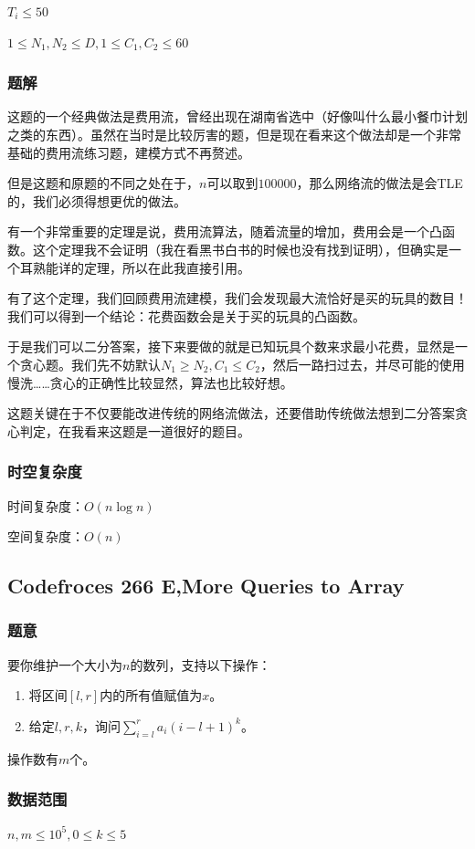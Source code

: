 \documentclass{ctexart}
\begin{document}
$T_i \le 50$

$1 \le N_1,N_2 \le D,1 \le C_1,C_2 \le 60$
\subsubsection{题解}
这题的一个经典做法是费用流，曾经出现在湖南省选中（好像叫什么最小餐巾计划之类的东西）。虽然在当时是比较厉害的题，但是现在看来这个做法却是一个非常基础的费用流练习题，建模方式不再赘述。

但是这题和原题的不同之处在于，$n$可以取到$100000$，那么网络流的做法是会TLE的，我们必须得想更优的做法。

有一个非常重要的定理是说，费用流算法，随着流量的增加，费用会是一个凸函数。这个定理我不会证明（我在看黑书白书的时候也没有找到证明），但确实是一个耳熟能详的定理，所以在此我直接引用。

有了这个定理，我们回顾费用流建模，我们会发现最大流恰好是买的玩具的数目！我们可以得到一个结论：花费函数会是关于买的玩具的凸函数。

于是我们可以二分答案，接下来要做的就是已知玩具个数来求最小花费，显然是一个贪心题。我们先不妨默认$N_1 \ge N_2,C_1 \le C_2$，然后一路扫过去，并尽可能的使用慢洗……贪心的正确性比较显然，算法也比较好想。

这题关键在于不仅要能改进传统的网络流做法，还要借助传统做法想到二分答案贪心判定，在我看来这题是一道很好的题目。
\subsubsection{时空复杂度}
时间复杂度：$O(n \log n)$

空间复杂度：$O(n)$
\subsection{Codefroces 266 E,More Queries to Array}
\subsubsection{题意}
要你维护一个大小为$n$的数列，支持以下操作：
\begin{enumerate}
\item 将区间$[l,r]$内的所有值赋值为$x$。
\item 给定$l,r,k$，询问$\sum\limits_{i=l}^r a_i(i-l+1)^k$。
\end{enumerate}
操作数有$m$个。
\subsubsection{数据范围}
$n,m \le 10^5,0 \le k \le 5$
\end{document}
